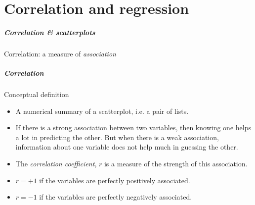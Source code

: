 \documentclass[handout]{beamer}
\begin{document}
   \part{Correlation and regression}
   \frame{\partpage}



   \begin{frame}
   \frametitle{Correlation \& scatterplots}
   \begin{center}
   \end{center}
   Correlation: a measure of {\em association}
   \end{frame}


   \begin{frame} \frametitle{Correlation}

   \begin{block}
   {Conceptual definition}

   \begin{itemize}
   \item A numerical summary of a scatterplot, i.e. a pair of lists.

   \item    If there is a strong association between two variables, then
   knowing one helps a lot in predicting the other. But when
   there is a weak association, information about one variable
   does not help much in guessing the other.

   \item The {\em correlation coefficient}, $r$ is a measure of the strength of this association.

   \item $r=+1$ if the variables are perfectly positively associated.

   \item $r=-1$ if the variables are perfectly negatively associated.
   \end{itemize}
   \end{block}
   \end{frame}
\end{document}
